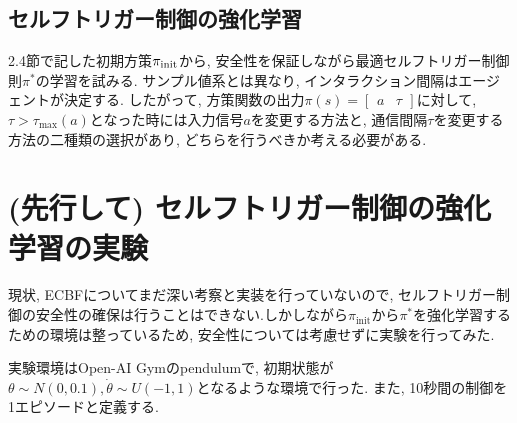 \documentclass{jsarticle}
\begin{document}
\subsection{セルフトリガー制御の強化学習}
2.4節で記した初期方策$\pi_{\rm{init}}$から, 安全性を保証しながら最適セルフトリガー制御則$\pi^{*}$の学習を試みる. サンプル値系とは異なり, インタラクション間隔はエージェントが決定する. したがって, 方策関数の出力$\pi(s) = \begin{bmatrix}a & \tau\end{bmatrix}$に対して,~$\tau>\tau_{\textrm{max}}(a)$となった時には入力信号$a$を変更する方法と, 通信間隔$\tau$を変更する方法の二種類の選択があり, どちらを行うべきか考える必要がある.


\section{(先行して) セルフトリガー制御の強化学習の実験}
現状, ECBFについてまだ深い考察と実装を行っていないので, セルフトリガー制御の安全性の確保は行うことはできない.しかしながら$\pi_{\textrm{init}}$から$\pi^{*}$を強化学習するための環境は整っているため, 安全性については考慮せずに実験を行ってみた.\par
実験環境はOpen-AI Gymのpendulumで, 初期状態が$\theta\sim N(0, 0.1), \dot{\theta}\sim U(-1,1)$となるような環境で行った. また, 10秒間の制御を1エピソードと定義する.\par
\end{document}
